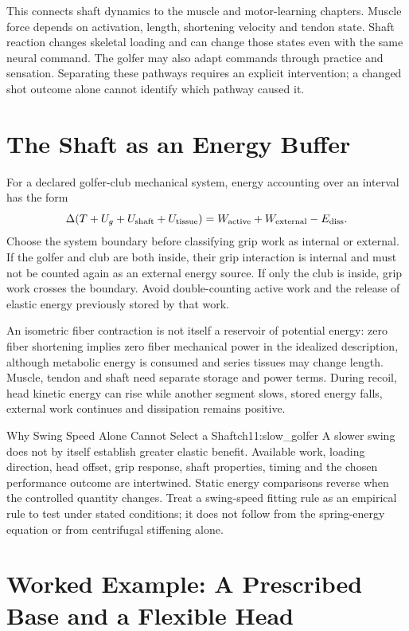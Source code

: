This connects shaft dynamics to the muscle and motor-learning chapters. Muscle force depends on activation, length, shortening velocity and tendon state. Shaft reaction changes skeletal loading and can change those states even with the same neural command. The golfer may also adapt commands through practice and sensation. Separating these pathways requires an explicit intervention; a changed shot outcome alone cannot identify which pathway caused it.

\section{The Shaft as an Energy Buffer}
For a declared golfer-club mechanical system, energy accounting over an interval has the form
\[
\Delta(T+U_g+U_{\rm shaft}+U_{\rm tissue})
=W_{\rm active}+W_{\rm external}-E_{\rm diss}.
\]
Choose the system boundary before classifying grip work as internal or external. If the golfer and club are both inside, their grip interaction is internal and must not be counted again as an external energy source. If only the club is inside, grip work crosses the boundary. Avoid double-counting active work and the release of elastic energy previously stored by that work.

An isometric fiber contraction is not itself a reservoir of potential energy: zero fiber shortening implies zero fiber mechanical power in the idealized description, although metabolic energy is consumed and series tissues may change length. Muscle, tendon and shaft need separate storage and power terms. During recoil, head kinetic energy can rise while another segment slows, stored energy falls, external work continues and dissipation remains positive.

\begin{laymansbox}{Why Swing Speed Alone Cannot Select a Shaft}{ch11:slow_golfer}
A slower swing does not by itself establish greater elastic benefit. Available work, loading direction, head offset, grip response, shaft properties, timing and the chosen performance outcome are intertwined. Static energy comparisons reverse when the controlled quantity changes. Treat a swing-speed fitting rule as an empirical rule to test under stated conditions; it does not follow from the spring-energy equation or from centrifugal stiffening alone.
\end{laymansbox}

\section{Worked Example: A Prescribed Base and a Flexible Head}
